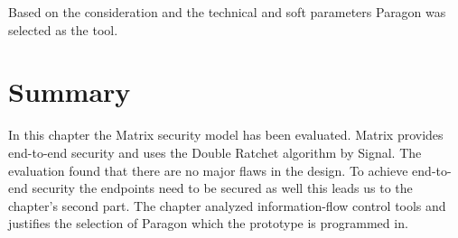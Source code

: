 Based on the consideration and the technical and soft parameters Paragon was selected as the tool. 


\section{Summary}
In this chapter the Matrix security model has been evaluated. Matrix provides end-to-end security and uses the Double Ratchet algorithm by Signal. The evaluation found that there are no major flaws in the design. To achieve end-to-end security the endpoints need to be secured as well \cite{Sabelfeld2003} this leads us to the chapter's second part. The chapter analyzed information-flow control tools and justifies the selection of Paragon which the prototype is programmed in. 